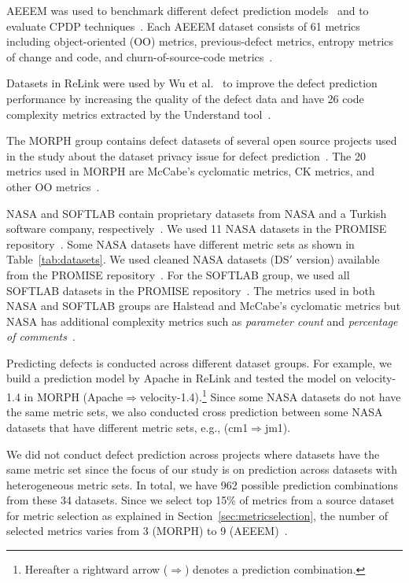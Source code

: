 AEEEM was used to benchmark different defect
prediction models~\cite{DAmbros12} and to evaluate CPDP
techniques~\cite{He14,Nam13}.
Each AEEEM dataset consists of 61 metrics including object-oriented (OO) metrics,
previous-defect metrics, entropy metrics of change and code, and churn-of-source-code
metrics~\cite{DAmbros12}.

Datasets in ReLink were used by Wu et
al.~\cite{Wu11} to improve the defect prediction performance by increasing the quality of the
defect data and have 26 code complexity metrics extracted by the Understand
tool~\cite{Understand}.

The MORPH group contains defect datasets of several open source projects used in
the study about the dataset privacy issue for defect prediction~\cite{Peters12}.
The 20 metrics used in MORPH are McCabe's cyclomatic metrics, CK metrics, and
other OO metrics~\cite{Peters12}.

NASA and SOFTLAB contain proprietary
datasets from NASA and a Turkish software company, respectively~\cite{Turhan09}.
We used 11 NASA datasets in the PROMISE
repository~\cite{promise12,Shepperd13}. Some NASA datasets have different metric sets as shown in Table~\ref{tab:datasets}. We used cleaned NASA datasets (DS$'$ version) available from the PROMISE repository~\cite{Shepperd13,promise12}.
For the SOFTLAB group, we used all SOFTLAB datasets in the PROMISE
repository~\cite{promise12}. The metrics used in both NASA and SOFTLAB groups
are Halstead and McCabe's cyclomatic metrics but NASA has additional
 complexity metrics such as {\em parameter count} and {\em percentage of comments}~\cite{promise12}.

Predicting defects is conducted across different dataset
groups.
For example, we build a prediction model by Apache in ReLink and tested the
model on velocity-1.4 in MORPH
(Apache$\Rightarrow$velocity-1.4).\footnote{Hereafter a rightward arrow
($\Rightarrow$) denotes a prediction combination.} Since some NASA datasets do not have the same metric sets, we also conducted cross prediction between some NASA datasets that have different metric sets, e.g., (cm1$\Rightarrow$jm1).

We did not conduct defect prediction across projects where datasets have the same metric set since the focus of our study is on prediction
across datasets with heterogeneous metric sets.
In total, we have 962 possible prediction combinations from these 34 datasets. Since we select top 15\% of metrics from a source dataset for metric selection as explained in Section~\ref{sec:metricselection}, the number of selected metrics varies from 3 (MORPH) to 9 (AEEEM)~\cite{Gao11}.

